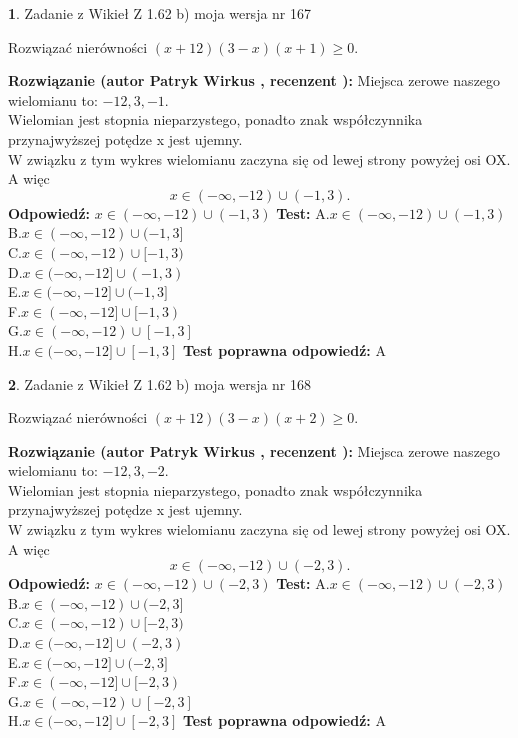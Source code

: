 \documentclass[12pt, a4paper]{article}
\theoremstyle{definition} %
\newtheorem{zad}{}
\newcommand{\zadStart}[1]{\begin{zad}#1\newline}
\newcommand{\zadStop}{\end{zad}}
\newcommand{\rozwStart}[2]{\noindent \textbf{Rozwiązanie (autor #1 , recenzent #2): }\newline}
\newcommand{\rozwStop}{\newline}
\newcommand{\odpStart}{\noindent \textbf{Odpowiedź:}\newline}
\newcommand{\odpStop}{\newline}
\newcommand{\testStart}{\noindent \textbf{Test:}\newline}
\newcommand{\testStop}{\newline}
\newcommand{\kluczStart}{\noindent \textbf{Test poprawna odpowiedź:}\newline}
\newcommand{\kluczStop}{\newline}
\begin{document}
\zadStart{Zadanie z Wikieł Z 1.62 b) moja wersja nr 167}

Rozwiązać nierówności $(x+12)(3-x)(x+1)\ge0$.
\zadStop
\rozwStart{Patryk Wirkus}{}
Miejsca zerowe naszego wielomianu to: $-12, 3, -1$.\\
Wielomian jest stopnia nieparzystego, ponadto znak współczynnika przy\linebreak najwyższej potędze x jest ujemny.\\ W związku z tym wykres wielomianu zaczyna się od lewej strony powyżej osi OX. A więc $$x \in (-\infty,-12) \cup (-1,3).$$
\rozwStop
\odpStart
$x \in (-\infty,-12) \cup (-1,3)$
\odpStop
\testStart
A.$x \in (-\infty,-12) \cup (-1,3)$\\
B.$x \in (-\infty,-12) \cup (-1,3]$\\
C.$x \in (-\infty,-12) \cup [-1,3)$\\
D.$x \in (-\infty,-12] \cup (-1,3)$\\
E.$x \in (-\infty,-12] \cup (-1,3]$\\
F.$x \in (-\infty,-12] \cup [-1,3)$\\
G.$x \in (-\infty,-12) \cup [-1,3]$\\
H.$x \in (-\infty,-12] \cup [-1,3]$
\testStop
\kluczStart
A
\kluczStop



\zadStart{Zadanie z Wikieł Z 1.62 b) moja wersja nr 168}

Rozwiązać nierówności $(x+12)(3-x)(x+2)\ge0$.
\zadStop
\rozwStart{Patryk Wirkus}{}
Miejsca zerowe naszego wielomianu to: $-12, 3, -2$.\\
Wielomian jest stopnia nieparzystego, ponadto znak współczynnika przy\linebreak najwyższej potędze x jest ujemny.\\ W związku z tym wykres wielomianu zaczyna się od lewej strony powyżej osi OX. A więc $$x \in (-\infty,-12) \cup (-2,3).$$
\rozwStop
\odpStart
$x \in (-\infty,-12) \cup (-2,3)$
\odpStop
\testStart
A.$x \in (-\infty,-12) \cup (-2,3)$\\
B.$x \in (-\infty,-12) \cup (-2,3]$\\
C.$x \in (-\infty,-12) \cup [-2,3)$\\
D.$x \in (-\infty,-12] \cup (-2,3)$\\
E.$x \in (-\infty,-12] \cup (-2,3]$\\
F.$x \in (-\infty,-12] \cup [-2,3)$\\
G.$x \in (-\infty,-12) \cup [-2,3]$\\
H.$x \in (-\infty,-12] \cup [-2,3]$
\testStop
\kluczStart
A
\kluczStop
\end{document}
